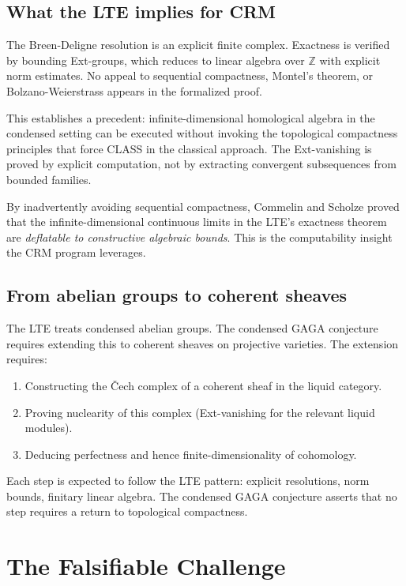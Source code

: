 \documentclass[11pt,a4paper]{article}
\theoremstyle{plain}
\theoremstyle{definition}
\newcommand{\CLASS}{\textsf{CLASS}}
\newcommand{\Z}{\mathbb{Z}}
\begin{document}
\subsection{What the LTE implies for CRM}

The Breen-Deligne resolution is an explicit finite complex.
Exactness is verified by bounding Ext-groups, which reduces to linear algebra over $\Z$ with explicit norm estimates.
No appeal to sequential compactness, Montel's theorem, or Bolzano-Weierstrass appears in the formalized proof.

This establishes a precedent: infinite-dimensional homological algebra in the condensed setting can be executed without invoking the topological compactness principles that force \CLASS{} in the classical approach.
The Ext-vanishing is proved by explicit computation, not by extracting convergent subsequences from bounded families.

By inadvertently avoiding sequential compactness, Commelin and Scholze proved that the infinite-dimensional continuous limits in the LTE's exactness theorem are \emph{deflatable to constructive algebraic bounds}.
This is the computability insight the CRM program leverages.

\subsection{From abelian groups to coherent sheaves}

The LTE treats condensed abelian groups.
The condensed GAGA conjecture requires extending this to coherent sheaves on projective varieties.
The extension requires:
\begin{enumerate}[nosep]
\item Constructing the Čech complex of a coherent sheaf in the liquid category.
\item Proving nuclearity of this complex (Ext-vanishing for the relevant liquid modules).
\item Deducing perfectness and hence finite-dimensionality of cohomology.
\end{enumerate}
Each step is expected to follow the LTE pattern: explicit resolutions, norm bounds, finitary linear algebra.
The condensed GAGA conjecture asserts that no step requires a return to topological compactness.

\section{The Falsifiable Challenge}
\label{sec:falsifiability}
\end{document}
